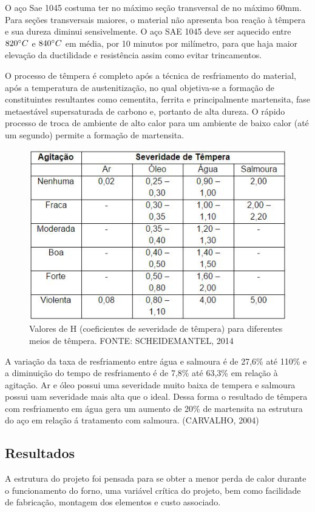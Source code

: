 O aço Sae 1045 costuma ter no máximo seção transversal de no máximo 60mm. Para seções transversais maiores, o material não apresenta boa reação à têmpera e sua dureza diminui sensivelmente. O aço SAE 1045 deve ser aquecido entre $820 \degree C$ e $840 \degree C$ em média, por 10 minutos por milímetro, para que haja maior elevação da ductilidade e resistência assim como evitar trincamentos.

O processo de têmpera é completo após a técnica de resfriamento do material, após a temperatura de austenitização, no qual objetiva-se a formação de constituintes resultantes como cementita, ferrita e principalmente martensita, fase metaestável supersaturada de carbono e, portanto de alta dureza. O rápido processo de troca de ambiente de alto calor para um ambiente de baixo calor (até um segundo) permite a formação de martensita.

\begin{figure}[ht]
	\centering
	\label{tab_valoresH}
	\includegraphics[keepaspectratio=true,scale=0.8]{figuras/tab_valoresH.JPG}
	\caption{Valores de H (coeficientes de severidade de têmpera) para diferentes meios de têmpera. FONTE: SCHEIDEMANTEL, 2014}
\end{figure}

A variação da taxa de resfriamento entre água e salmoura é de 27,6\% até 110\% e a diminuição do tempo de resfriamento é de 7,8\% até 63,3\% em relação à agitação. Ar e óleo possui uma severidade muito baixa de tempera e salmoura possui uam severidade mais alta que o ideal. Dessa forma o resultado de têmpera com resfriamento em água gera um aumento de 20\% de martensita na estrutura do aço em relação á tratamento com salmoura. (CARVALHO, 2004)

\subsection{Resultados}
A estrutura do projeto foi pensada para se obter a menor perda de calor durante o funcionamento do forno, uma variável crítica do projeto, bem como facilidade de fabricação, montagem dos elementos e custo associado.

